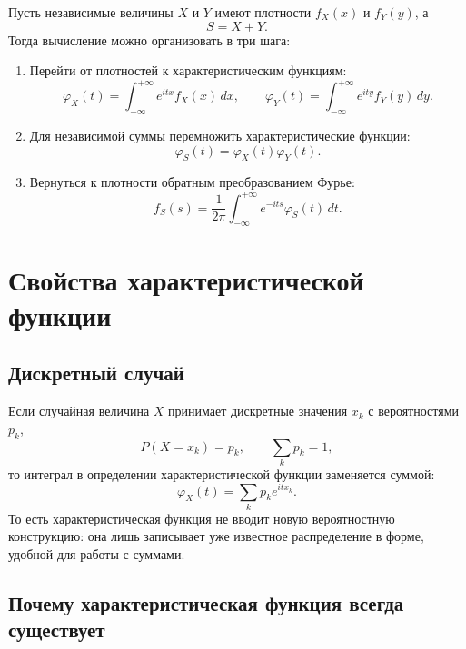 \documentclass[
  russian,
  12pt,
  a4paper,
  a4paper,
  openany]{scrbook}
\begin{document}
Пусть независимые величины \(X\) и \(Y\) имеют плотности \(f_X(x)\) и
\(f_Y(y)\), а \[S=X+Y.\] Тогда вычисление можно организовать в три шага:

\begin{enumerate}
\def\labelenumi{\arabic{enumi}.}
\item
  Перейти от плотностей к характеристическим функциям: \[\varphi_X(t)
  =
  \int_{-\infty}^{+\infty}e^{itx}f_X(x)\,dx,
  \qquad
  \varphi_Y(t)
  =
  \int_{-\infty}^{+\infty}e^{ity}f_Y(y)\,dy.\]
\item
  Для независимой суммы перемножить характеристические функции:
  \[\boxed{
  \varphi_S(t)=\varphi_X(t)\varphi_Y(t).
  }\]
\item
  Вернуться к плотности обратным преобразованием Фурье: \[\boxed{
  f_S(s)
  =
  \frac{1}{2\pi}
  \int_{-\infty}^{+\infty}
  e^{-its}\varphi_S(t)\,dt.
  }\]
\end{enumerate}

\section{Свойства характеристической
функции}\label{ux441ux432ux43eux439ux441ux442ux432ux430-ux445ux430ux440ux430ux43aux442ux435ux440ux438ux441ux442ux438ux447ux435ux441ux43aux43eux439-ux444ux443ux43dux43aux446ux438ux438}

\subsection{Дискретный
случай}\label{ux434ux438ux441ux43aux440ux435ux442ux43dux44bux439-ux441ux43bux443ux447ux430ux439}

Если случайная величина \(X\) принимает дискретные значения \(x_k\) с
вероятностями \(p_k\), \[P(X=x_k)=p_k,
\qquad
\sum_k p_k=1,\] то интеграл в определении характеристической функции
заменяется суммой: \[\boxed{
\varphi_X(t)
=
\sum_k p_k e^{itx_k}.
}\] То есть характеристическая функция не вводит новую вероятностную
конструкцию: она лишь записывает уже известное распределение в форме,
удобной для работы с суммами.

\subsection{Почему характеристическая функция всегда
существует}\label{ux43fux43eux447ux435ux43cux443-ux445ux430ux440ux430ux43aux442ux435ux440ux438ux441ux442ux438ux447ux435ux441ux43aux430ux44f-ux444ux443ux43dux43aux446ux438ux44f-ux432ux441ux435ux433ux434ux430-ux441ux443ux449ux435ux441ux442ux432ux443ux435ux442}
\end{document}
